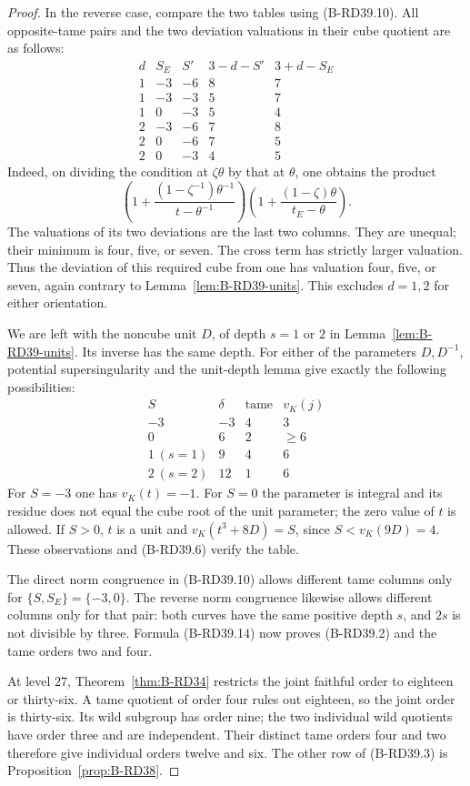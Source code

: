 \begin{proof}
In the reverse case, compare the two tables using (B-RD39.10).
All opposite-tame pairs and the two deviation valuations in their
cube quotient are as follows:
\[
\begin{array}{c|rr|rr}
d&S_E&S'&3-d-S'&3+d-S_E\\\hline
1&-3&-6&8&7\\
1&-3&-3&5&7\\
1&0&-3&5&4\\
2&-3&-6&7&8\\
2&0&-6&7&5\\
2&0&-3&4&5
\end{array}                                             \tag{B-RD39.12}
\]
Indeed, on dividing the condition at $\zeta\theta$ by that at
$\theta$, one obtains the product
\[
 \left(1+\frac{(1-\zeta^{-1})\theta^{-1}}
                      {t-\theta^{-1}}\right)
 \left(1+\frac{(1-\zeta)\theta}{t_E-\theta}\right).
                                                        \tag{B-RD39.13}
\]
The valuations of its two deviations are the last two columns.
They are unequal; their minimum is four, five, or seven. The cross
term has strictly larger valuation. Thus the deviation of this
required cube from one has valuation four, five, or seven, again
contrary to Lemma~\ref{lem:B-RD39-units}. This excludes $d=1,2$
for either orientation.

We are left with the noncube unit $D$, of depth $s=1$ or $2$ in
Lemma~\ref{lem:B-RD39-units}. Its inverse has the same depth.
For either of the parameters $D,D^{-1}$, potential
supersingularity and the unit-depth lemma give exactly the following
possibilities:
\[
\begin{array}{c|c|c|c}
S&\delta&\text{tame}&v_K(j)\\\hline
-3&-3&4&3\\
0&6&2&\ge6\\
1\ (s=1)&9&4&6\\
2\ (s=2)&12&1&6
\end{array}                                             \tag{B-RD39.14}
\]
For $S=-3$ one has $v_K(t)=-1$. For $S=0$ the parameter is
integral and its residue does not equal the cube root of the unit
parameter; the zero value of $t$ is allowed. If $S>0$, $t$ is a
unit and $v_K(t^3+8D)=S$, since $S< v_K(9D)=4$.
These observations and (B-RD39.6) verify the table.

The direct norm congruence in (B-RD39.10) allows different tame
columns only for $\{S,S_E\}=\{-3,0\}$. The reverse norm
congruence likewise allows different columns only for that pair:
both curves have the same positive depth $s$, and $2s$ is not
divisible by three. Formula (B-RD39.14) now proves (B-RD39.2) and
the tame orders two and four.

At level $27$, Theorem~\ref{thm:B-RD34} restricts the joint faithful
order to eighteen or thirty-six. A tame quotient of order four
rules out eighteen, so the joint order is thirty-six. Its wild
subgroup has order nine; the two individual wild quotients have
order three and are independent. Their distinct tame orders four
and two therefore give individual orders twelve and six. The
other row of (B-RD39.3) is Proposition~\ref{prop:B-RD38}.
\end{proof}


